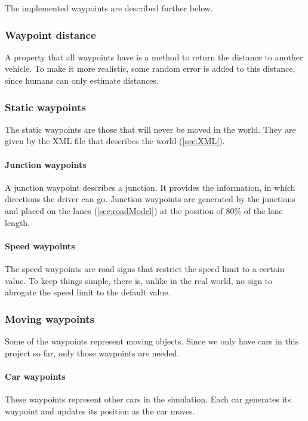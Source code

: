 \noindent The implemented waypoints are described further below. \\

\subsubsection{Waypoint distance}
\label{sec:movingWPDistance}
A property that all waypoints have is a method to 
return the distance to another vehicle. To make it more realistic, some random 
error is added to this distance, since humans can only estimate distances.

\subsubsection{Static waypoints}

The static waypoints are those that will never be moved in the world.
They are given by the XML file that describes the world (\ref{sec:XML}).

\paragraph{Junction waypoints}
A junction waypoint describes a junction. It provides the information, in
which directions the driver can go. Junction waypoints are generated by the
junctions and placed on the lanes (\ref{sec:roadModel}) at the position of
80\% of the lane length.

\paragraph{Speed waypoints}
The speed waypoints are road signs that restrict the speed limit to a certain
value. To keep things simple, there is, unlike in the real world, no sign to 
abrogate the speed limit to the default value. \\

\subsubsection{Moving waypoints}

Some of the waypoints represent moving objects. Since we only have cars in this
project so far, only those waypoints are needed. \\

\paragraph{Car waypoints}
These waypoints represent other cars in the simulation. Each car generates its
waypoint and updates its position as the car moves.

